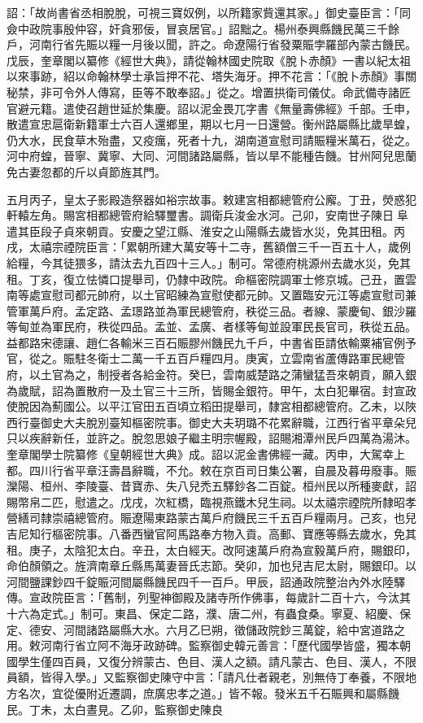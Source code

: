 \begin{pinyinscope}
詔：「故尚書省丞相脫脫，可視三寶奴例，以所籍家貲還其家。」御史臺臣言：「同僉中政院事殷仲容，奸貪邪佞，冒哀居官。」詔黜之。楊州泰興縣饑民萬三千餘戶，河南行省先賑以糧一月後以聞，許之。命遼陽行省發粟賑孛羅部內蒙古饑民。戊辰，奎章閣以纂修《經世大典》，請從翰林國史院取《脫卜赤顏》一書以紀太祖以來事跡，紹以命翰林學士承旨押不花、塔失海牙。押不花言：「《脫卜赤顏》事關秘禁，非可令外人傳寫，臣等不敢奉詔。」從之。增置拱衛司儀仗。命武備寺諸匠官避元籍。遣使召趙世延於集慶。詔以泥金畏兀字書《無量壽佛經》千部。壬申，散遣宣忠扈衛新籍軍士六百人還鄉里，期以七月一日還營。衡州路屬縣比歲旱蝗，仍大水，民食草木殆盡，又疫癘，死者十九，湖南道宣慰司請賑糧米萬石，從之。河中府蝗，晉寧、冀寧、大同、河間諸路屬縣，皆以旱不能種告饑。甘州阿兒思蘭免古妻忽都的斤以貞節旌其門。



 五月丙子，皇太子影殿造祭器如裕宗故事。敕建宮相都總管府公廨。丁丑，熒惑犯軒轅左角。賜宮相都總管府給驛璽書。調衛兵浚金水河。己卯，安南世子陳日阜遣其臣段子貞來朝貢。安慶之望江縣、淮安之山陽縣去歲皆水災，免其田租。丙戌，太禧宗禋院臣言：「累朝所建大萬安等十二寺，舊額僧三千一百五十人，歲例給糧，今其徒猥多，請汰去九百四十三人。」制可。常德府桃源州去歲水災，免其租。丁亥，復立怯憐口提舉司，仍隸中政院。命樞密院調軍士修京城。己丑，置雲南等處宣慰司都元帥府，以土官昭練為宣慰使都元帥。又置臨安元江等處宣慰司兼管軍萬戶府。孟定路、孟璟路並為軍民總管府，秩從三品。者線、蒙慶甸、銀沙羅等甸並為軍民府，秩從四品。孟並、孟廣、者樣等甸並設軍民長官司，秩從五品。益都路宋德讓、趙仁各輸米三百石賑膠州饑民九千戶，中書省臣請依輸粟補官例予官，從之。賑駐冬衛士二萬一千五百戶糧四月。庚寅，立雲南省蘆傳路軍民總管府，以土官為之，制授者各給金符。癸巳，雲南威楚路之蒲蠻猛吾來朝貢，願入銀為歲賦，詔為置散府一及土官三十三所，皆賜金銀符。甲午，太白犯畢宿。封宣政使脫因為薊國公。以平江官田五百頃立稻田提舉司，隸宮相都總管府。乙未，以陜西行臺御史大夫脫別臺知樞密院事。御史大夫玥璐不花累辭職，江西行省平章朵兒只以疾辭新任，並許之。脫忽思娘子繼主明宗幄殿，詔賜湘潭州民戶四萬為湯沐。奎章閣學士院纂修《皇朝經世大典》成。詔以泥金書佛經一藏。丙申，大駕幸上都。四川行省平章汪壽昌辭職，不允。敕在京百司日集公署，自晨及暮毋廢事。賑灤陽、桓州、李陵臺、昔寶赤、失八兒禿五驛鈔各二百錠。桓州民以所種麥獻，詔賜幣帛二匹，慰遣之。戊戌，次紅橋，臨視燕鐵木兒生祠。以太禧宗禋院所隸昭孝營繕司隸崇禧總管府。賑遼陽東路蒙古萬戶府饑民三千五百戶糧兩月。己亥，也兒吉尼知行樞密院事。八番西蠻官阿馬路奉方物入貢。高郵、寶應等縣去歲水，免其租。庚子，太陰犯太白。辛丑，太白經天。改阿速萬戶府為宣毅萬戶府，賜銀印，命伯顏領之。旌濟南章丘縣馬萬妻晉氏志節。癸卯，加也兒吉尼太尉，賜銀印。以河間鹽課鈔四千錠賑河間屬縣饑民四千一百戶。甲辰，詔通政院整治內外水陸驛傳。宣政院臣言：「舊制，列聖神御殿及諸寺所作佛事，每歲計二百十六，今汰其十六為定式。」制可。東昌、保定二路，濮、唐二州，有蟲食桑。寧夏、紹慶、保定、德安、河間諸路屬縣大水。六月乙巳朔，徵儲政院鈔三萬錠，給中宮道路之用。敕河南行省立阿不海牙政跡碑。監察御史韓元善言：「歷代國學皆盛，獨本朝國學生僅四百員，又復分辨蒙古、色目、漢人之額。請凡蒙古、色目、漢人，不限員額，皆得入學。」又監察御史陳守中言：「請凡仕者親老，別無侍丁奉養，不限地方名次，宜從優附近遷調，庶廣忠孝之道。」皆不報。發米五千石賑興和屬縣饑民。丁未，太白晝見。乙卯，監察御史陳良
\end{pinyinscope}
